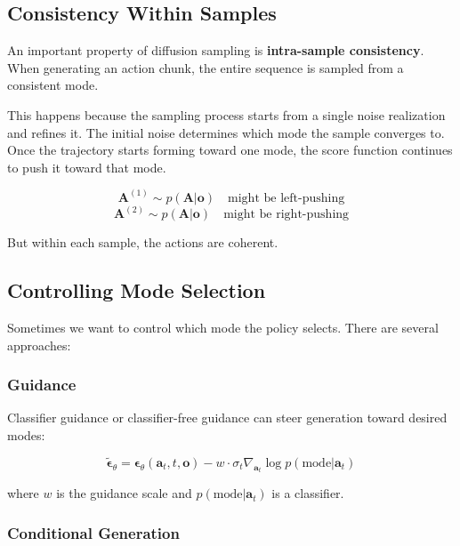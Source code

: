 \subsection{Consistency Within Samples}
\label{subsec:sample_consistency}

An important property of diffusion sampling is \textbf{intra-sample consistency}. When generating an action chunk, the entire sequence is sampled from a consistent mode.

This happens because the sampling process starts from a single noise realization and refines it. The initial noise determines which mode the sample converges to. Once the trajectory starts forming toward one mode, the score function continues to push it toward that mode.

\begin{equation}
\mathbf{A}^{(1)} \sim p(\mathbf{A} | \mathbf{o}) \quad \text{might be left-pushing}
\end{equation}
\begin{equation}
\mathbf{A}^{(2)} \sim p(\mathbf{A} | \mathbf{o}) \quad \text{might be right-pushing}
\end{equation}

But within each sample, the actions are coherent.

\subsection{Controlling Mode Selection}
\label{subsec:mode_selection}

Sometimes we want to control which mode the policy selects. There are several approaches:

\subsubsection{Guidance}

Classifier guidance or classifier-free guidance can steer generation toward desired modes:

\begin{equation}
\tilde{\boldsymbol{\epsilon}}_\theta = \boldsymbol{\epsilon}_\theta(\mathbf{a}_t, t, \mathbf{o}) - w \cdot \sigma_t \nabla_{\mathbf{a}_t} \log p(\text{mode} | \mathbf{a}_t)
\label{eq:classifier_guidance}
\end{equation}

where $w$ is the guidance scale and $p(\text{mode} | \mathbf{a}_t)$ is a classifier.

\subsubsection{Conditional Generation}

